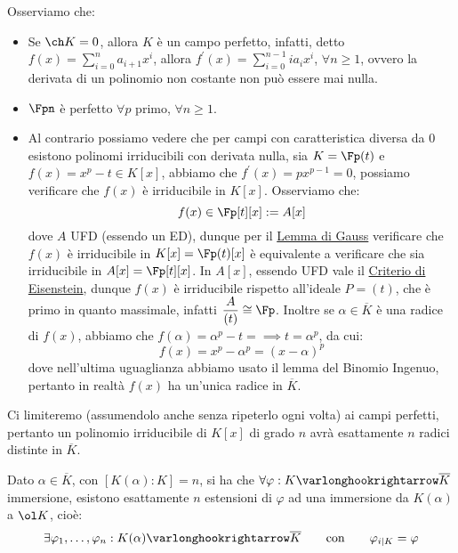 \documentclass[11pt]{scrartcl}
\begin{document}
\begin{remark}
    Osserviamo che:
    \begin{itemize}
        \item Se $\ch K = 0$, allora $K$ è un campo perfetto, infatti, detto $f(x) = \sum_{i=0}^n a_{i+1}x^i$, allora $f^{\prime}(x) = \sum_{i=0}^{n-1} ia_ix^i$, $\forall n \geq 1$, ovvero la derivata di un polinomio non 
        costante non può essere mai nulla.
        \item $\Fpn$ è perfetto $\forall p$ primo, $\forall n \geq 1$.
        \item Al contrario possiamo vedere che per campi con caratteristica diversa da 0 esistono polinomi irriducibili con derivata nulla, sia $K = \Fp(t)$ e $f(x) = x^p - t \in K[x]$, abbiamo che $f^{\prime}(x) = px^{p-1} = 0$,
        possiamo verificare che $f(x)$ è irriducibile in $K[x]$. Osserviamo che:
        \[ f(x) \in \Fp[t][x] := A[x]
            \]
        dove $A$ UFD (essendo un ED), dunque per il \hyperref[gauss]{Lemma di Gauss} verificare che $f(x)$ è irriducibile in $K[x] = \Fp(t)[x]$ è equivalente a verificare che sia irriducibile in $A[x] = \Fp[t][x]$.
        In $A[x]$, essendo UFD vale il \hyperref[eisenstein]{Criterio di Eisenstein}, dunque $f(x)$ è irriducibile rispetto all'ideale $P = (t)$, che è primo in quanto massimale, infatti $\displaystyle\frac{A}{(t)} \cong \Fp$.
        Inoltre se $\alpha \in \overline K$ è una radice di $f(x)$, abbiamo che $f(\alpha) = \alpha^p - t = \implies t = \alpha^p$, da cui:
        \[ f(x) = x^p - \alpha^p = (x - \alpha)^p
            \]
        dove nell'ultima uguaglianza abbiamo usato il lemma del Binomio Ingenuo, pertanto in realtà $f(x)$ ha un'unica radice in $\overline K$.
    \end{itemize}
\end{remark}

Ci limiteremo (assumendolo anche senza ripeterlo ogni volta) ai campi perfetti, pertanto un polinomio irriducibile di $K[x]$ di grado $n$ avrà esattamente $n$ radici distinte in $\overline K$.

\begin{proposition}
    \label{3.37}
    Dato $\alpha \in \overline K$, con $[K(\alpha) : K] = n$, si ha che $\forall \varphi : K \varlonghookrightarrow \overline K$ immersione, esistono esattamente $n$ estensioni di $\varphi$ ad una immersione da $K(\alpha)$ a $\ol K$, cioè:
    \[ \exists \varphi_1,\ldots,\varphi_n : K(\alpha) \varlonghookrightarrow \overline K \qquad \text{con} \qquad \varphi_{i|K} = \varphi
        \]
\end{proposition}
\end{document}
